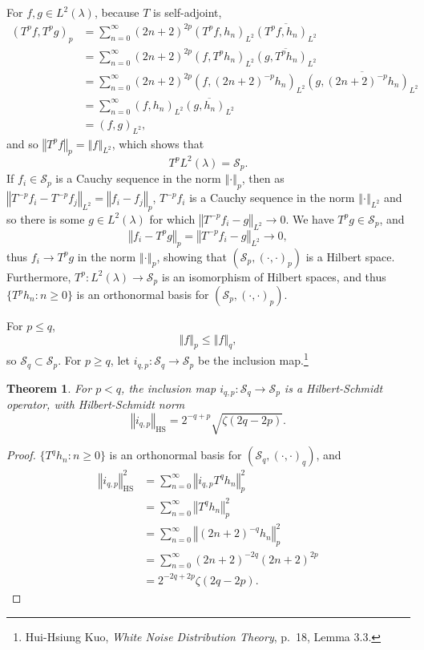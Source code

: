 \documentclass{article}
\newcommand{\norm}[1]{\left\Vert #1 \right\Vert}
\newcommand{\HS}[1]{\left\Vert #1 \right\Vert_{\mathrm{HS}}}
\newtheorem{theorem}{Theorem}
\theoremstyle{definition}
\begin{document}
For $f,g \in L^2(\lambda)$, because $T$ is self-adjoint,
\begin{align*}
(T^p f,T^p g)_p &=\sum_{n=0}^\infty (2n+2)^{2p} (T^p f,h_n)_{L^2} \overline{(T^p f,h_n)_{L^2}}\\
&=\sum_{n=0}^\infty (2n+2)^{2p} (f,T^p h_n)_{L^2} \overline{(g,T^p h_n)_{L^2}}\\
&=\sum_{n=0}^\infty (2n+2)^{2p} (f,(2n+2)^{-p} h_n)_{L^2} \overline{(g,(2n+2)^{-p} h_n)_{L^2}} \\
&=\sum_{n=0}^\infty (f,h_n)_{L^2} \overline{(g,h_n)_{L^2}}\\
&=(f,g)_{L^2},
\end{align*}
and so $\norm{T^p f}_p = \norm{f}_{L^2}$, which shows that 
\[
T^p L^2(\lambda) = \mathscr{S}_p.
\]
If $f_i \in \mathscr{S}_p$ is a Cauchy sequence in the norm $\norm{\cdot}_p$, 
then as $\norm{T^{-p} f_i-T^{-p} f_j}_{L^2}=\norm{f_i-f_j}_p$, 
$T^{-p}f_i$ is a Cauchy sequence in the norm $\norm{\cdot}_{L^2}$ and so there is  some
$g \in L^2(\lambda)$ for which $\norm{T^{-p}f_i-g}_{L^2} \to 0$. We have $T^p g \in \mathscr{S}_p$, and
\[
\norm{f_i-T^p g}_p = \norm{T^{-p} f_i-g}_{L^2} \to 0,
\]
thus $f_i \to T^p g$ in the norm $\norm{\cdot}_p$, showing that 
$(\mathscr{S}_p,(\cdot,\cdot)_p)$ is a Hilbert space. 
Furthermore, $T^p:L^2(\lambda) \to \mathscr{S}_p$ is an isomorphism of Hilbert spaces, and thus
$\{T^p h_n: n \geq 0\}$ is an orthonormal basis for $(\mathscr{S}_p,(\cdot,\cdot)_p)$. 



For $p \leq q$,
\[
\norm{f}_p \leq \norm{f}_q,
\]
so $\mathscr{S}_q \subset \mathscr{S}_p$. 
For $p \geq q$, let $i_{q,p}:\mathscr{S}_q \to \mathscr{S}_p$ be the inclusion
map.\footnote{Hui-Hsiung Kuo, {\em White Noise Distribution Theory}, p.~18, Lemma 3.3.}

\begin{theorem}
For $p < q$, the inclusion map $i_{q,p}:\mathscr{S}_q \to \mathscr{S}_p$ is
a Hilbert-Schmidt operator, with Hilbert-Schmidt norm
\[
\HS{i_{q,p}} = 2^{-q+p} \sqrt{\zeta(2q-2p)}.
\]
\end{theorem}
\begin{proof}
$\{T^q h_n: n \geq 0\}$ is an orthonormal basis for $(\mathscr{S}_q,(\cdot,\cdot)_q)$, and
\begin{align*}
\HS{i_{q,p}}^2&=\sum_{n=0}^\infty \norm{i_{q,p} T^q h_n}_p^2\\
&=\sum_{n=0}^\infty \norm{T^q h_n}_p^2\\
&=\sum_{n=0}^\infty \norm{(2n+2)^{-q} h_n}_p^2\\
&=\sum_{n=0}^\infty (2n+2)^{-2q} (2n+2)^{2p}\\
&=2^{-2q+2p} \zeta(2q-2p).
\end{align*}
\end{proof}
\end{document}

